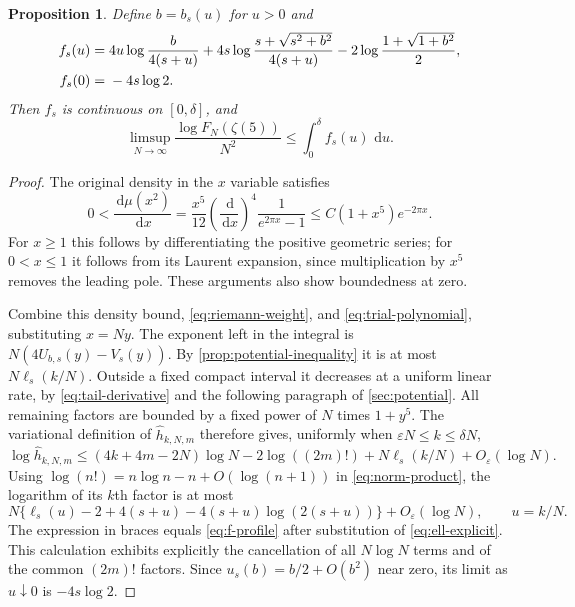 \documentclass[11pt,letterpaper]{article}
\newtheorem{proposition}[proposition]{Proposition}
\theoremstyle{definition}
\newcommand{\dd}{\,\mathrm d}
\begin{document}
\begin{proposition}\label{prop:analytic-rate}
Define $b=b_s(u)$ for $u>0$ and
\begin{align}
 f_s(u)={}&
 4u\log\frac{b}{4(s+u)}
 +4s\log\frac{s+\sqrt{s^2+b^2}}{4(s+u)}
 -2\log\frac{1+\sqrt{1+b^2}}2,\label{eq:f-profile}\\
 f_s(0)={}&-4s\log2.\notag
\end{align}
Then $f_s$ is continuous on $[0,\delta]$, and
\begin{equation}\label{eq:analytic-rate}
 \limsup_{N\to\infty}\frac{\log F_N(\zeta(5))}{N^2}
 \le \int_0^\delta f_s(u)\,\dd u.
\end{equation}
\end{proposition}
\begin{proof}
The original density in the $x$ variable satisfies
\[
 0<\frac{\dd\mu(x^2)}{\dd x}
 =\frac{x^5}{12}\left(\frac{\dd}{\dd x}\right)^4
                 \frac1{e^{2\pi x}-1}
 \le C(1+x^5)e^{-2\pi x}.
\]
For $x\ge1$ this follows by differentiating the positive geometric series;
for $0<x\le1$ it follows from its Laurent expansion, since multiplication
by $x^5$ removes the leading pole. These arguments also show boundedness
at zero.

Combine this density bound, \eqref{eq:riemann-weight}, and
\eqref{eq:trial-polynomial}, substituting $x=Ny$. The exponent left in the
integral is $N(4U_{b,s}(y)-V_s(y))$.
By \cref{prop:potential-inequality} it is at most $N\ell_s(k/N)$.
Outside a fixed compact interval it decreases at a uniform linear rate,
by \eqref{eq:tail-derivative} and the following paragraph of
\cref{sec:potential}. All remaining factors are bounded by a fixed
power of $N$ times $1+y^5$. The variational definition of
$\widehat h_{k,N,m}$ therefore gives, uniformly when
$\varepsilon N\le k\le\delta N$,
\begin{equation}\label{eq:norm-bound}
 \log\widehat h_{k,N,m}
 \le(4k+4m-2N)\log N-2\log((2m)!)
       +N\ell_s(k/N)+O_\varepsilon(\log N).
\end{equation}
Using $\log(n!)=n\log n-n+O(\log(n+1))$ in
\eqref{eq:norm-product}, the logarithm of its $k$th factor is at most
\[
 N\{\ell_s(u)-2+4(s+u)-4(s+u)\log(2(s+u))\}
 +O_\varepsilon(\log N),\qquad u=k/N.
\]
The expression in braces equals \eqref{eq:f-profile} after substitution
of \eqref{eq:ell-explicit}. This calculation exhibits explicitly the
cancellation of all $N\log N$ terms and of the common $(2m)!$ factors.
Since $u_s(b)=b/2+O(b^2)$ near zero, its limit as $u\downarrow0$ is
$-4s\log2$.


\end{proof}
\end{document}
